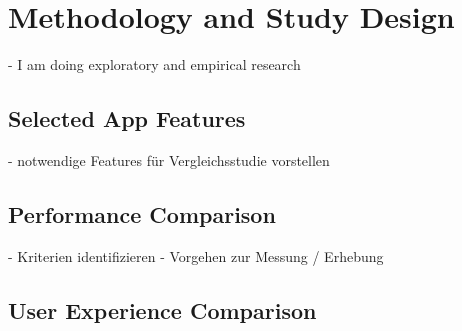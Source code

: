 \chapter{Methodology and Study Design}
- I am doing exploratory and empirical research

\section{Selected App Features}
- notwendige Features für Vergleichsstudie vorstellen

\section{Performance Comparison}
- Kriterien identifizieren 
- Vorgehen zur Messung / Erhebung


\section{User Experience Comparison}
